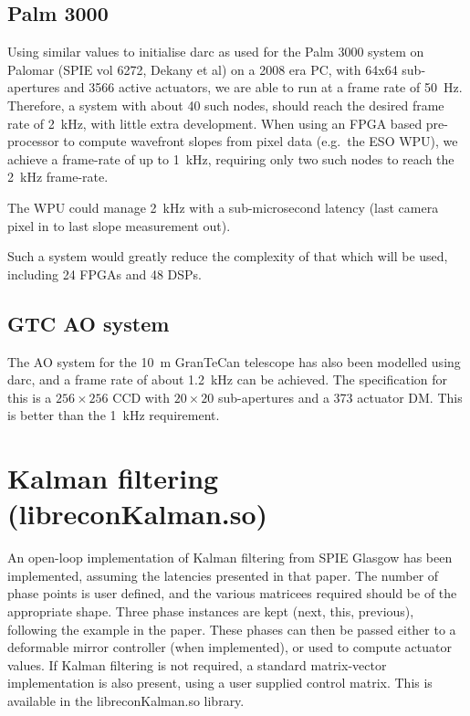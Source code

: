 \documentclass[a4,10pt]{article}
\begin{document}
\subsection{Palm 3000}
Using similar values to initialise darc as used for the Palm 3000
system on Palomar (SPIE vol 6272, Dekany et al) on a 2008 era PC,
with 64x64 sub-apertures and 3566 active actuators, we are able to run
at a frame rate of 50~Hz.  Therefore, a system with about 40 such
nodes, should reach the desired frame rate of 2~kHz, with little extra
development.  When using an FPGA based pre-processor to compute
wavefront slopes from pixel data (e.g.\ the ESO WPU), we achieve a
frame-rate of up to 1~kHz, requiring only two such nodes to reach the
2~kHz frame-rate.

The WPU could manage 2~kHz with a sub-microsecond latency (last camera
pixel in to last slope measurement out).

Such a system would greatly reduce the complexity of that which will
be used, including 24 FPGAs and 48 DSPs.

\subsection{GTC AO system}
The AO system for the 10~m GranTeCan telescope has also been modelled
using darc, and a frame rate of about 1.2~kHz can be achieved.  The
specification for this is a $256\times256$ CCD with $20\times20$
sub-apertures and a 373 actuator DM.  This is better than the 1~kHz
requirement.



\section{Kalman filtering (libreconKalman.so)}
\label{sect:kalman}
An open-loop implementation of Kalman filtering from SPIE Glasgow has
been implemented, assuming the latencies presented in that paper.  The
number of phase points is user defined, and the various matricees
required should be of the appropriate shape.  Three phase instances
are kept (next, this, previous), following the example in the paper.
These phases can then be passed either to a deformable mirror
controller (when implemented), or used to compute actuator values.  If
Kalman filtering is not required, a standard matrix-vector
implementation is also present, using a user supplied control matrix.
This is available in the libreconKalman.so library.
\end{document}
